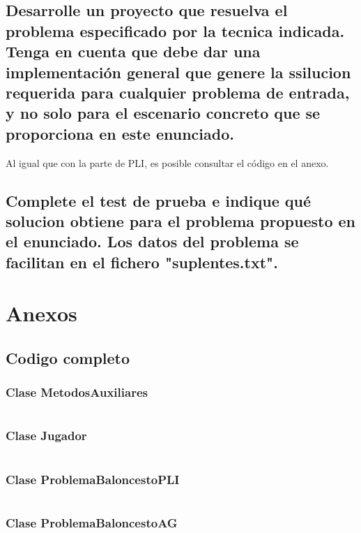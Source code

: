 \documentclass[a4paper,12pt]{article}
\begin{document}
\subsection{Desarrolle un proyecto que resuelva el problema especificado por la tecnica indicada. Tenga en cuenta que debe dar una implementación general que genere la ssilucion requerida para cualquier problema de entrada, y no solo para el escenario concreto que se proporciona en este enunciado.}
Al igual que con la parte de PLI, es posible consultar el código en el anexo.
\subsection{Complete el test de prueba e indique qué solucion obtiene para el problema propuesto en el enunciado. Los datos del problema se facilitan en el fichero "suplentes.txt".}

\section{Anexos}
\subsection{Codigo completo}
\subsubsection{Clase MetodosAuxiliares}
\inputminted[fontsize=\footnotesize,breaklines]{java}{src/andalu30/PracticaIndividual1/MetodosAuxiliares.java}

\subsubsection{Clase Jugador}
\inputminted[fontsize=\footnotesize,breaklines]{java}{src/andalu30/PracticaIndividual1/Jugador.java}

\subsubsection{Clase ProblemaBaloncestoPLI}
\inputminted[fontsize=\footnotesize,breaklines]{java}{src/andalu30/PracticaIndividual1/ProblemaBaloncestoPLI.java}

\subsubsection{Clase ProblemaBaloncestoAG}
\inputminted[fontsize=\footnotesize,breaklines]{java}{src/andalu30/PracticaIndividual1/ProblemaBaloncestoAG.java}
\end{document}
